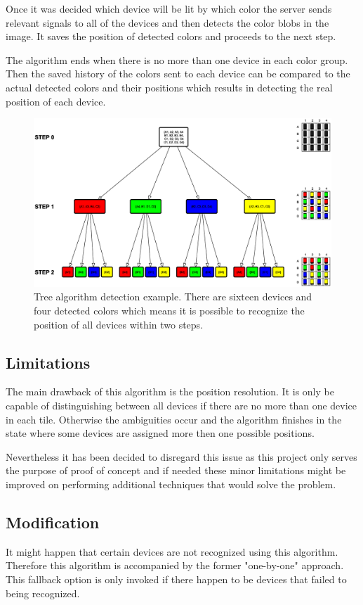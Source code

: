 Once it was decided which device will be lit by which color the server sends relevant signals to all of the devices and then detects the color blobs in the image. It saves the position of detected colors and proceeds to the next step.

The algorithm ends when there is no more than one device in each color group. Then the saved history of the colors sent to each device can be compared to the actual detected colors and their positions which results in detecting the real position of each device.

\begin{figure}[H]
	\centering
		\includegraphics[width=21cm, angle=90]{sprint5/tree_algorithm.eps}
	\caption[Tree algorithm detection example]{Tree algorithm detection example. There are sixteen devices and four detected colors which means it is possible to recognize the position of all devices within two steps.}
	\label{fig:sprint5_tree_alg}
\end{figure}

\subsection{Limitations}
The main drawback of this algorithm is the position resolution. It is only be capable of distinguishing between all devices if there are no more than one device in each tile. Otherwise the ambiguities occur and the algorithm finishes in the state where some devices are assigned more then one possible positions.

Nevertheless it has been decided to disregard this issue as this project only serves the purpose of proof of concept and if needed these minor limitations might be improved on performing additional techniques that would solve the problem.

\subsection{Modification}
It might happen that certain devices are not recognized using this algorithm. Therefore this algorithm is accompanied by the former "one-by-one" approach. This fallback option is only invoked if there happen to be devices that failed to being recognized.

